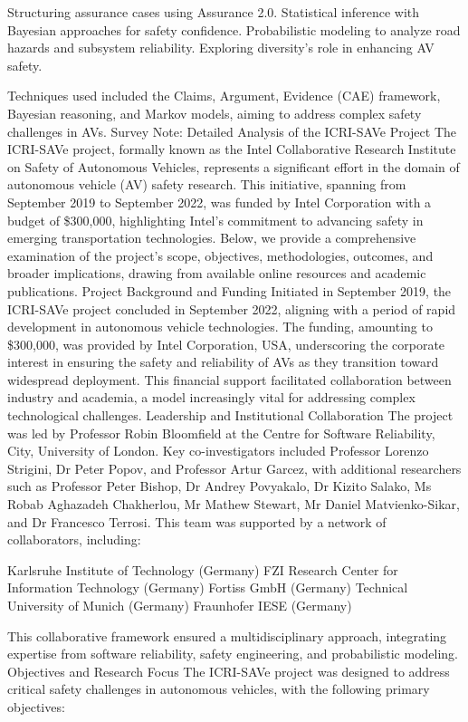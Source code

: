     Structuring assurance cases using Assurance 2.0.
    Statistical inference with Bayesian approaches for safety confidence.
    Probabilistic modeling to analyze road hazards and subsystem reliability.
    Exploring diversity's role in enhancing AV safety.

Techniques used included the Claims, Argument, Evidence (CAE) framework, Bayesian reasoning, and Markov models, aiming to address complex safety challenges in AVs.
Survey Note: Detailed Analysis of the ICRI-SAVe Project
The ICRI-SAVe project, formally known as the Intel Collaborative Research Institute on Safety of Autonomous Vehicles, represents a significant effort in the domain of autonomous vehicle (AV) safety research. This initiative, spanning from September 2019 to September 2022, was funded by Intel Corporation with a budget of \$300,000, highlighting Intel's commitment to advancing safety in emerging transportation technologies. Below, we provide a comprehensive examination of the project's scope, objectives, methodologies, outcomes, and broader implications, drawing from available online resources and academic publications.
Project Background and Funding
Initiated in September 2019, the ICRI-SAVe project concluded in September 2022, aligning with a period of rapid development in autonomous vehicle technologies. The funding, amounting to \$300,000, was provided by Intel Corporation, USA, underscoring the corporate interest in ensuring the safety and reliability of AVs as they transition toward widespread deployment. This financial support facilitated collaboration between industry and academia, a model increasingly vital for addressing complex technological challenges.
Leadership and Institutional Collaboration
The project was led by Professor Robin Bloomfield at the Centre for Software Reliability, City, University of London. Key co-investigators included Professor Lorenzo Strigini, Dr Peter Popov, and Professor Artur Garcez, with additional researchers such as Professor Peter Bishop, Dr Andrey Povyakalo, Dr Kizito Salako, Ms Robab Aghazadeh Chakherlou, Mr Mathew Stewart, Mr Daniel Matvienko-Sikar, and Dr Francesco Terrosi. This team was supported by a network of collaborators, including:

    Karlsruhe Institute of Technology (Germany)
    FZI Research Center for Information Technology (Germany)
    Fortiss GmbH (Germany)
    Technical University of Munich (Germany)
    Fraunhofer IESE (Germany)

This collaborative framework ensured a multidisciplinary approach, integrating expertise from software reliability, safety engineering, and probabilistic modeling.
Objectives and Research Focus
The ICRI-SAVe project was designed to address critical safety challenges in autonomous vehicles, with the following primary objectives:

